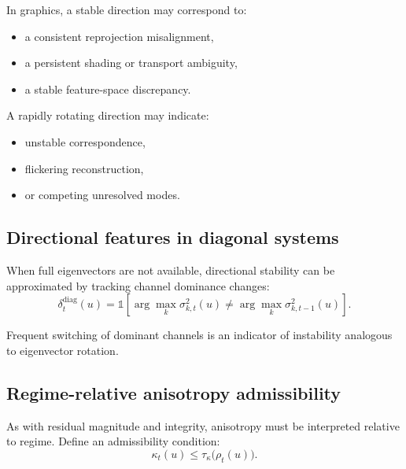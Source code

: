 \documentclass[11pt]{article}
\theoremstyle{definition}
\theoremstyle{plain}
\begin{document}
In graphics, a stable direction may correspond to:
\begin{itemize}[leftmargin=1.5em]
    \item a consistent reprojection misalignment,
    \item a persistent shading or transport ambiguity,
    \item a stable feature-space discrepancy.
\end{itemize}

A rapidly rotating direction may indicate:
\begin{itemize}[leftmargin=1.5em]
    \item unstable correspondence,
    \item flickering reconstruction,
    \item or competing unresolved modes.
\end{itemize}


\subsection{Directional features in diagonal systems}

When full eigenvectors are not available, directional stability can be approximated by tracking channel dominance changes:
\begin{equation}
\delta_t^{\mathrm{diag}}(u)=
\mathbb{1}\!\left[\arg\max_k \sigma^2_{k,t}(u)\neq \arg\max_k \sigma^2_{k,t-1}(u)\right].
\end{equation}

Frequent switching of dominant channels is an indicator of instability analogous to eigenvector rotation.


\subsection{Regime-relative anisotropy admissibility}

As with residual magnitude and integrity, anisotropy must be interpreted relative to regime. Define an admissibility condition:
\begin{equation}
\kappa_t(u)\le \tau_\kappa\bigl(\rho_t(u)\bigr).
\end{equation}
\end{document}
